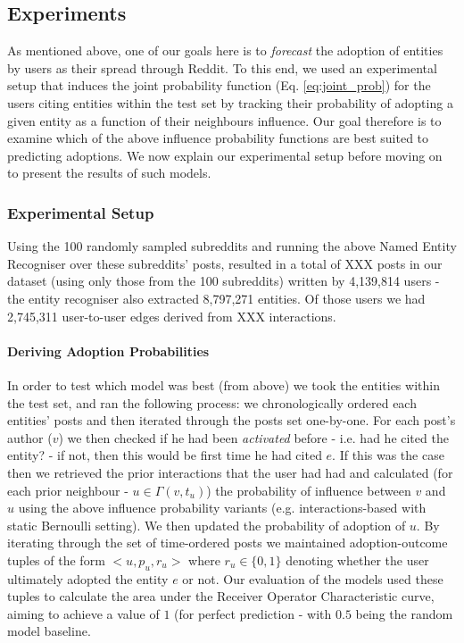 \documentclass[journal,10pt,draftclsnofoot,onecolumn]{IEEEtran}
\begin{document}
\subsection{Experiments}
As mentioned above, one of our goals here is to \emph{forecast} the adoption of entities by users as their spread through Reddit.
To this end, we used an experimental setup that induces the joint probability function (Eq. \ref{eq:joint_prob}) for the users citing entities within the test set by tracking their probability of adopting a given entity as a function of their neighbours influence.
Our goal therefore is to examine which of the above influence probability functions are best suited to predicting adoptions.
We now explain our experimental setup before moving on to present the results of such models.

\subsubsection{Experimental Setup}
Using the 100 randomly sampled subreddits and running the above Named Entity Recogniser over these subreddits' posts, resulted in a total of XXX posts in our dataset (using only those from the 100 subreddits) written by 4,139,814 users - the entity recogniser also extracted 8,797,271 entities.
Of those users we had 2,745,311 user-to-user edges derived from XXX interactions.

\paragraph{Deriving Adoption Probabilities}
In order to test which model was best (from above) we took the entities within the test set, and ran the following process: we chronologically ordered each entities' posts and then iterated through the posts set one-by-one.
For each post's author ($v$) we then checked if he had been \emph{activated} before - i.e. had he cited the entity? - if not, then this would be first time he had cited $e$.
If this was the case then we retrieved the prior interactions that the user had had and calculated (for each prior neighbour - $u \in \Gamma(v, t_u)$) the probability of influence between $v$ and $u$ using the above influence probability variants (e.g. interactions-based with static Bernoulli setting).
We then updated the probability of adoption of $u$.
By iterating through the set of time-ordered posts we maintained adoption-outcome tuples of the form $<u, p_u, r_u>$ where $r_u \in \{0,1\}$ denoting whether the user ultimately adopted the entity $e$ or not.
Our evaluation of the models used these tuples to calculate the area under the Receiver Operator Characteristic curve, aiming to achieve a value of $1$ (for perfect prediction - with $0.5$ being the random model baseline.
\end{document}
